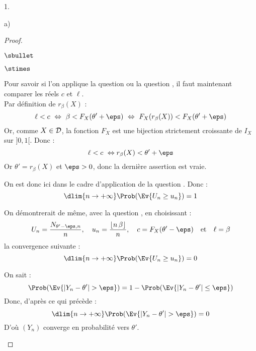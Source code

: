 \documentclass[11pt]{article}%
\begin{document}
\begin{noliste}{1.}
\begin{noliste}{a)}
\begin{proof}
\begin{noliste}{$\sbullet$}
\begin{noliste}{$\stimes$}
	  \item Pour savoir si l'on applique la question 
	  ou la question , il faut maintenant comparer les 
	  réels $c$ et $\ell$.\\
	  Par définition de $r_\beta(X)$ :
	  \[
	    \ell < c \ \Leftrightarrow \ \beta < F_X(\theta' +\eps)
	    \ \Leftrightarrow \ F_X(r_\beta(X)) < F_X(\theta' +\eps)
	  \]
	  Or, comme $X\in {\cal D}$, la fonction $F_X$ est une 
	  bijection strictement croissante de $I_X$ sur $]0,1[$. Donc :
	  \[
	    \ell < c \ \Leftrightarrow r_\beta(X) < \theta'+\eps
	  \]
	  Or $\theta'=r_\beta(X)$ et $\eps >0$, donc la dernière 
	  assertion est vraie.
	  
	  \item On est donc ici dans le cadre d'application de la 
	question . Donc :
	\[
	  \dlim{n\to +\infty} \Prob(\Ev{U_n \geq u_n})=1
	\]
	
	\item On démontrerait de même, avec la question , en 
	choisissant :
	\[
	  U_n = \dfrac{N_{\theta'-\eps,n}}{n}, \quad u_n = 
	  \dfrac{\lfloor n \, \beta \rfloor}{n}, \quad c = F_X(\theta'
	  -\eps) \quad \text{et} \quad \ell = \beta
	\]
	la convergence suivante :
	\[
	  \dlim{n\to +\infty} \Prob(\Ev{U_n \geq u_n})=0
	\]
	\end{noliste}
	
	
	
	\newpage
	
	
	
	\item On sait :
	\[
	  \Prob(\Ev{\vert Y_n - \theta' \vert >\eps}) = 
	  1-\Prob(\Ev{\vert Y_n - \theta'\vert \leq \eps})
	\]
	Donc, d'après ce qui précède :
	\[
	  \dlim{n\to +\infty} \Prob(\Ev{\vert Y_n - \theta' 
	  \vert >\eps}) = 0
	\]
	D'où $(Y_n)$ converge en probabilité vers $\theta'$.
      \end{noliste}
      

\end{proof}
\end{noliste}
\end{noliste}
\end{document}

